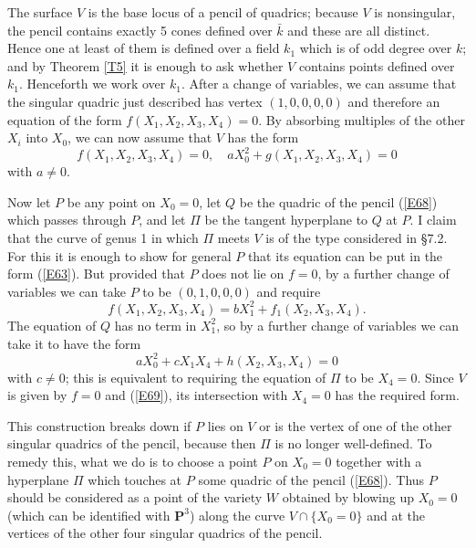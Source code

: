\documentclass[12pt]{article}
\def\bP{{\mathbf P}}
\def\beq{\begin{equation} \label}
\begin{document}
The surface $V$ is the base locus of a pencil of quadrics;
because $V$ is nonsingular, the pencil contains exactly 5
cones defined over $\bar{k}$ and these are all distinct.
Hence one at least of them is defined over a field $k_1$
which is of odd degree over $k$; and by Theorem \ref{T5} it is
enough to ask whether $V$ contains points defined over $k_1$.
Henceforth we work over $k_1$. After a change of variables, we
can assume that the singular quadric just described has vertex
$(1,0,0,0,0)$ and therefore an equation of the form $f(X_1,
X_2,X_3,X_4)=0$. By absorbing multiples of the other $X_i$
into $X_0$, we can now assume that $V$ has the form
\beq{E68} f(X_1,X_2,X_3,X_4)=0, \quad
aX_0^2+g(X_1,X_2,X_3,X_4)=0 \end{equation}
with $a\neq0$.

Now let $P$ be any point on $X_0=0$, let $Q$ be the quadric
of the pencil (\ref{E68}) which passes through $P$, and let
$\Pi$ be the tangent hyperplane to $Q$ at $P$. I claim that
the curve of genus 1 in which $\Pi$ meets $V$ is of the type
considered in \S7.2. For this it is enough to show for general
$P$ that its equation can be put in the form (\ref{E63}). But
provided that $P$ does not lie on $f=0$, by a further change
of variables we can take $P$ to be $(0,1,0,0,0)$ and require
\[ f(X_1,X_2,X_3,X_4)=bX_1^2+f_1(X_2,X_3,X_4). \]
The equation of $Q$ has no term in $X_1^2$, so by a further
change of variables we can take it to have the form
\beq{E69} aX_0^2+cX_1X_4+h(X_2,X_3,X_4)=0 \end{equation}
with $c\neq0$; this is equivalent to requiring the equation of
$\Pi$ to be $X_4=0$. Since $V$ is given by $f=0$ and
(\ref{E69}), its intersection with $X_4=0$ has the required
form.

This construction breaks down if $P$ lies on $V$ or is the
vertex of one of the other singular quadrics of the pencil,
because then $\Pi$ is no longer well-defined. To remedy this,
what we do is to choose a point $P$ on $X_0=0$ together with
a hyperplane $\Pi$ which touches at $P$ some quadric of the
pencil (\ref{E68}). Thus $P$ should be considered as a point
of the variety $W$ obtained by blowing up $X_0=0$ (which can
be identified with $\bP^3$) along the curve $V\cap\{X_0=0\}$
and at the vertices of the other four singular quadrics of
the pencil.
\end{document}
